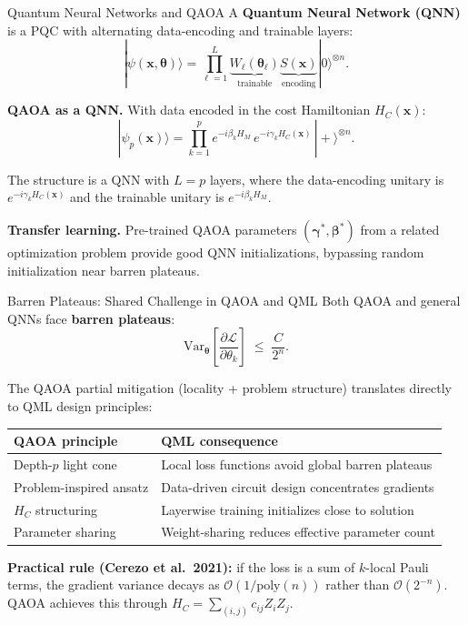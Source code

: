 \documentclass{beamer}
\begin{document}

\begin{frame}{Quantum Neural Networks and QAOA}
A \textbf{Quantum Neural Network (QNN)} is a PQC with
alternating data-encoding and trainable layers:
\[
|\psi(\mathbf{x},\boldsymbol{\theta})\rangle
= \prod_{\ell=1}^L
\underbrace{W_\ell(\boldsymbol{\theta}_\ell)}_{\text{trainable}}
\underbrace{S(\mathbf{x})}_{\text{encoding}}
|0\rangle^{\otimes n}.
\]

\textbf{QAOA as a QNN.}  With data encoded in the cost Hamiltonian
$H_C(\mathbf{x})$:
\[
|\psi_p(\mathbf{x})\rangle
= \prod_{k=1}^p e^{-i\beta_k H_M}\,e^{-i\gamma_k H_C(\mathbf{x})}\,
|+\rangle^{\otimes n}.
\]

The structure is a QNN with $L=p$ layers, where the data-encoding
unitary is $e^{-i\gamma_k H_C(\mathbf{x})}$ and the trainable unitary
is $e^{-i\beta_k H_M}$.

\medskip

\textbf{Transfer learning.}  Pre-trained QAOA parameters
$(\boldsymbol{\gamma}^*,\boldsymbol{\beta}^*)$ from a related
optimization problem provide good QNN initializations, bypassing
random initialization near barren plateaus.
\end{frame}


\begin{frame}{Barren Plateaus: Shared Challenge in QAOA and QML}
Both QAOA and general QNNs face \textbf{barren plateaus}:
\[
\mathrm{Var}_{\boldsymbol{\theta}}\!\left[\frac{\partial\mathcal{L}}{\partial\theta_k}\right]
\;\leq\; \frac{C}{2^n}.
\]

The QAOA partial mitigation (locality + problem structure) translates
directly to QML design principles:

\medskip

\begin{center}
\small
\begin{tabular}{ll}
\hline
\textbf{QAOA principle} & \textbf{QML consequence} \\
\hline
Depth-$p$ light cone & Local loss functions avoid global barren plateaus \\
Problem-inspired ansatz & Data-driven circuit design concentrates gradients \\
$H_C$ structuring & Layerwise training initializes close to solution \\
Parameter sharing & Weight-sharing reduces effective parameter count \\
\hline
\end{tabular}
\end{center}

\medskip

\textbf{Practical rule (Cerezo et al.\ 2021):} if the loss is a sum
of $k$-local Pauli terms, the gradient variance decays as
$\mathcal{O}(1/\mathrm{poly}(n))$ rather than $\mathcal{O}(2^{-n})$.
QAOA achieves this through $H_C = \sum_{(i,j)} c_{ij}Z_iZ_j$.
\end{frame}
\end{document}
